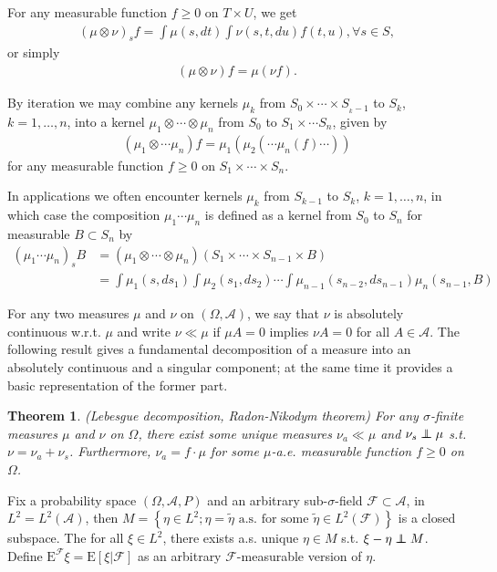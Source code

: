 \documentclass[12pt,a4paper]{article}
\newcommand{\E}{\mathop{\mathbb{E}}}
\def \E{\mbox{E}}
\def \A {\mathcal{A}}
\def \F {\mathcal{F}}
\newtheorem{theorem}{Theorem}[section]
\newcommand\independent{\protect\mathpalette{\protect\independenT}{\perp}}
\def\independenT#1#2{\mathrel{\rlap{$#1#2$}\mkern2mu{#1#2}}}
\begin{document}
For any measurable function $f\ge 0$ on $T\times U$, we get
\begin{align*}
  (\mu\otimes \nu)_s f  = \int \mu(s,dt) \int \nu(s,t,du)f(t,u), \forall s\in S,
\end{align*}
or simply
\begin{align*}
  (\mu\otimes \nu)f = \mu(\nu f).
\end{align*}

By iteration we may combine any kernels $\mu_k$ from $S_0\times \cdots \times S_{_k-1}$ to $S_k$, $k=1,\dots,n$, into a kernel $\mu_1\otimes\cdots\otimes\mu_n$ from $S_0$ to $S_1\times\cdots S_n$, given by
\begin{align*}
  (\mu_1\otimes\cdots\mu_n) f = \mu_1(\mu_2(\cdots \mu_n(f)\cdots))
\end{align*}
for any measurable function $f\ge 0$ on $S_1\times\cdots\times S_n$.

In applications we often encounter kernels $\mu_k$ from $S_{k-1}$ to $S_k$, $k=1,\dots,n$, in which case the composition $\mu_1\cdots \mu_n$ is defined as a kernel from $S_0$ to $S_n$ for measurable $B\subset S_n$ by 
\begin{align*}
  (\mu_1\cdots \mu_n)_s B &= (\mu_1\otimes\cdots\otimes\mu_n)(S_1\times\cdots\times S_{n-1}\times B)\\
  &= \int \mu_1(s,d s_1) \int \mu_2(s_1,ds_2)\cdots \int \mu_{n-1}(s_{n-2},ds_{n-1}) \mu_n(s_{n-1},B)
\end{align*}


For any two measures $\mu$ and $\nu$ on $(\Omega, \A)$, we say that $\nu$ is absolutely continuous w.r.t. $\mu$ and write $\nu\ll \mu$ if $\mu A=0$ implies $\nu A=0$ for all $A\in \A$. The following result gives a fundamental decomposition of a measure into an absolutely continuous and a singular component; at the same time it provides a basic representation of the former part.
\begin{theorem}
  (Lebesgue decomposition, Radon-Nikodym theorem) For any $\sigma$-finite measures $\mu$ and $\nu$ on $\Omega$, there exist some unique measures $\nu_a\ll\mu$ and $\nu_s\independent\mu$ s.t. $\nu = \nu_a + \nu_s$. Furthermore, $\nu_a = f\cdot \mu$ for some $\mu$-a.e. measurable function $f\ge 0$ on $\Omega$.
  \label{thm:radonNikodym}
\end{theorem}



Fix a probability space $(\Omega,\A,P)$ and an arbitrary sub-$\sigma$-field $\F\subset \A$, in $L^2 = L^2(\A)$, then $M=\left\{ \eta \in L^2; \eta = \tilde{\eta} \textrm{ a.s. for some } \tilde{\eta} \in L^2(\F) \right\}$ is a closed subspace. The for all $\xi\in L^2$, there exists a.s. unique $\eta \in M$ s.t. $\xi - \eta \independent M $. Define $\E^{\F}\xi  = \E\left[ \xi | \F \right]$ as an arbitrary $\F$-measurable version of $\eta$.
\end{document}
